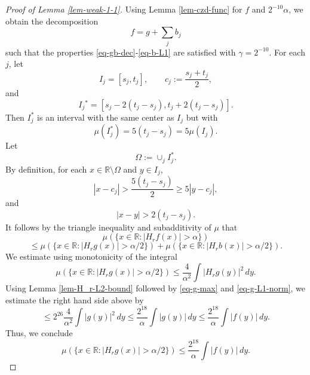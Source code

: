 {\begin{proof}[Proof of Lemma \ref{lem-weak-1-1}]
Using Lemma \ref{lem-czd-func} for $f$ and $2^{-10}\alpha$, we obtain the decomposition
$$f=g+\sum_j b_j$$
such that the properties \eqref{eq-gb-dec}-\eqref{eq-b-L1} are satisfied with $\gamma=2^{-10}$. For each $j$, let
\begin{equation}
    \label{eq-Ij-cj}
    I_j=[s_j, t_j], \qquad c_j:=\frac{s_j+t_j}{2},
\end{equation}
and
\begin{equation}
    \label{eq-Ij*}
    I_j{^*}=\left[s_j-{2(t_j-s_j)}, t_j+2(t_j-s_j)\right].
\end{equation}
Then $I_j^*$ is an interval with the same center as $I_j$ but with
\begin{equation}
    \label{eq-Ij*-dim}
    \mu(I_j^*)=5(t_j-s_j)=5\mu(I_j).
\end{equation}
Let
\begin{equation}
    \label{eq-omega}
    \Omega:=\cup_j I_{j}^*.
\end{equation}
By definition, for each $x\in \mathbb{R}\setminus\Omega$ and $y\in I_j$,
\begin{equation}
    \label{eq-Om-cj}
    |x-c_j|>\frac{5(t_j-s_j)}{2}\geq 5|y-c_j|,
\end{equation}
and
\begin{equation}
    \label{eq-Om-y}
    |x-y|>{2(t_j-s_j)}.
\end{equation}
It follows by the triangle inequality and subadditivity of $\mu$ that
$$ \mu\left(\{x\in \mathbb{R}: |H_r f(x)|>\alpha\}\right) $$
\begin{equation}
\label{eq-set-dec-1}
 \le \mu\left(\{x\in \mathbb{R}: |H_r g(x)|>{\alpha}/2\}\right)+  \mu\left(\{x\in \mathbb{R}: |H_r b(x)|>{\alpha}/2\}\right).
\end{equation}
We estimate using monotonicity of the integral
$$ \mu\left(\{x\in \mathbb{R}: |H_r g(x)|>{\alpha}/2\}\right)\leq
\frac{4}{\alpha^2} \int |H_r g(y)|^2\, dy. $$
Using Lemma \ref{lem-H_r-L2-bound} followed by \eqref{eq-g-max} and \eqref{eq-g-L1-norm}, we estimate the right hand side above by
$$\leq 2^{26}\frac{4}{\alpha^2} \int |g(y)|^2\, dy\leq \frac{2^{18}}{\alpha} \int |g(y)|\, dy\leq \frac{2^{18}}{\alpha} \int |f(y)|\, dy.$$
Thus, we conclude
\begin{equation}
    \label{eq-g-func-bd}
    \mu\left(\{x\in \mathbb{R}: |H_r g(x)|>{\alpha}/2\}\right)\leq
    \frac{2^{18}}{\alpha} \int |f(y)|\, dy.

\end{equation}
\end{proof}}
